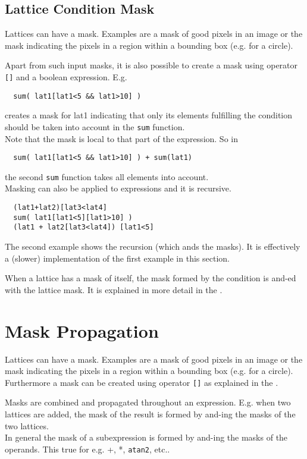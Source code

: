 \subsection{\label{LEL:CONDITIONS}Lattice Condition Mask}
Lattices can have a mask. Examples are a mask of good pixels in an
image or the mask indicating the pixels in a region within a bounding box
(e.g. for a circle).

Apart from such input masks, it is also possible to create a mask
using operator \texttt{[]} and a boolean expression. E.g.
\begin{verbatim}
  sum( lat1[lat1<5 && lat1>10] )
\end{verbatim}
creates a mask for lat1 indicating that only its elements fulfilling
the condition should be taken into account in the \texttt{sum}
function.
\\Note that the mask is local to that part of the expression. So in
\begin{verbatim}
  sum( lat1[lat1<5 && lat1>10] ) + sum(lat1)
\end{verbatim}
the second \texttt{sum} function takes all elements into account.
\\Masking can also be applied to expressions and it is recursive.
\begin{verbatim}
  (lat1+lat2)[lat3<lat4]
  sum( lat1[lat1<5][lat1>10] )
  (lat1 + lat2[lat3<lat4]) [lat1<5]
\end{verbatim}
The second example shows the recursion (which ands the masks).
It is effectively a (slower) implementation of the
first example in this section.

When a lattice has a mask of itself, the mask formed by the condition
is and-ed with the lattice mask. It is explained in more detail in the
.


\section{\label{LEL:MASKS}Mask Propagation}
Lattices can have a mask. Examples are a mask of good pixels in an
image or the mask indicating the pixels in a region within a bounding box
(e.g. for a circle).
Furthermore a mask can be created using operator \texttt{[]}
as explained in the .

Masks are combined and propagated throughout an expression.
E.g. when two lattices are added, the mask of the result is formed
by and-ing the masks of the two lattices.
\\In general the mask of a subexpression is formed by and-ing
the masks of the operands. This true for e.g. +, *, \texttt{atan2},
etc..

